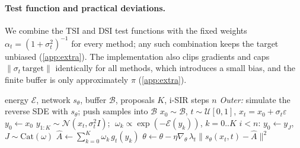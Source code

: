 \paragraph{Test function and practical deviations.}
We combine the TSI and DSI test functions with the fixed weights $\alpha_t=(1+\sigma_t^2)^{-1}$ for every method; any such combination keeps the target unbiased (\cref{app:extra}). The implementation also clips gradients and caps $\|\sigma_t\,\mathrm{target}\|$ identically for all methods, which introduces a small bias, and the finite buffer is only approximately $\pi$ (\cref{app:extra}).

\begin{algorithm}[t]
\caption{Anchored Energy Matching (AEM)}
\label{alg:aem}
\begin{algorithmic}
 energy $\mathcal{E}$, network $s_\theta$, buffer $\mathcal{B}$, proposals $K$, i-SIR steps $n$
\REPEAT
\STATE \emph{Outer:} simulate the reverse SDE with $s_\theta$; push samples into $\mathcal{B}$
\STATE $x_0\sim\mathcal{B}$, $t\sim\mathcal{U}[0,1]$, $x_t=x_0+\sigma_t\varepsilon$
\STATE $y_0\gets x_0$ \hfill{}
\STATE $y_{1:K}\sim\mathcal{N}(x_t,\sigma_t^2I)$; $\;\omega_k\propto \exp(-\mathcal{E}(y_k))$, $k=0..K$
 $i<n$: $y_0\gets y_J$, $J\sim\mathrm{Cat}(\omega)$
\ENDFOR
\STATE $\widehat A\gets\sum_{k=0}^K\omega_k\,g_t(y_k)$
\STATE $\theta\gets\theta-\eta\nabla_\theta\,\lambda_t\|s_\theta(x_t,t)-\widehat A\|^2$
\ENDFOR
{}
\end{algorithmic}
\end{algorithm}
